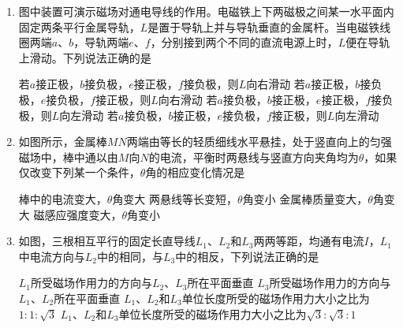 \begin{enumerate}
\item
{}
图中装置可演示磁场对通电导线的作用。电磁铁上下两磁极之间某一水平面内固定两条平行金属导轨，$ L $是置于导轨上并与导轨垂直的金属杆。当电磁铁线圈两端$ a $、$ b $，导轨两端$ e $、$ f $，分别接到两个不同的直流电源上时，$ L $便在导轨上滑动。下列说法正确的是  
\begin{figure}[h!]
\centering

\end{figure}


\fourchoices
{若$ a $接正极，$ b $接负极，$ e $接正极，$ f $接负极，则$ L $向右滑动}
{若$ a $接正极，$ b $接负极，$ e $接负极，$ f $接正极，则$ L $向右滑动}
{若$ a $接负极，$ b $接正极，$ e $接正极，$ f $接负极，则$ L $向左滑动}
{若$ a $接负极，$ b $接正极，$ e $接负极，$ f $接正极，则$ L $向左滑动}




\item
{}
如图所示，金属棒$ MN $两端由等长的轻质细线水平悬挂，处于竖直向上的匀强磁场中，棒中通以由$ M $向$ N $的电流，平衡时两悬线与竖直方向夹角均为$ \theta $，如果仅改变下列某一个条件，$ \theta $角的相应变化情况是
\begin{figure}[h!]
\centering

\end{figure}

\fourchoices
{棒中的电流变大，$	\theta$角变大}
{两悬线等长变短，$	\theta$角变小}
{金属棒质量变大，$	\theta$角变大}
{磁感应强度变大，$	\theta$角变小}





\item
{}
如图，三根相互平行的固定长直导线$ L_{1} $、$ L_{2} $和$ L_{3} $两两等距，均通有电流$ I $，$ L_{1} $中电流方向与$ L_{2} $中的相同，与$ L_{3} $中的相反，下列说法正确的是  
\begin{figure}[h!]
\centering

\end{figure}



\fourchoices
{$ L_{1} $所受磁场作用力的方向与$ L_{2} $、$ L_{3} $所在平面垂直}
{$ L_{3} $所受磁场作用力的方向与$ L_{1} $、$ L_{2} $所在平面垂直}
{$ L_{1} $、$ L_{2} $和$ L_{3} $单位长度所受的磁场作用力大小之比为$1: 1: \sqrt { 3 }$}
{$ L_{1} $、$ L_{2} $和$ L_{3} $单位长度所受的磁场作用力大小之比为$\sqrt { 3 }: \sqrt { 3 }: 1$}






\end{enumerate}
